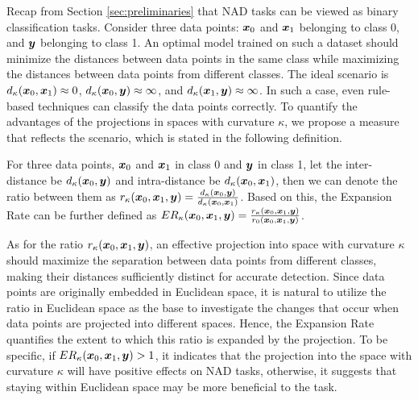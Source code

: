 Recap from Section \ref{sec:preliminaries} that NAD tasks can be viewed as binary classification tasks. Consider three data points: $\boldsymbol{x}_0$ and $\boldsymbol{x}_1$ belonging to class 0, and $\boldsymbol{y}$ belonging to class 1. An optimal model trained on such a dataset should minimize the distances between data points in the same class while maximizing the distances between data points from different classes. The ideal scenario is $d_\kappa(\boldsymbol{x}_0, \boldsymbol{x}_1)\approx0$, $d_\kappa(\boldsymbol{x}_0, \boldsymbol{y})\approx\infty$, and $d_\kappa(\boldsymbol{x}_1, \boldsymbol{y})\approx\infty$. In such a case, even rule-based techniques can classify the data points correctly. To quantify the advantages of the projections in spaces with curvature $\kappa$, we propose a measure that reflects the scenario, which is stated in the following definition. %
\begin{definition}
\label{def:expension}
    For three data points, $\boldsymbol{x}_0$ and $\boldsymbol{x}_1$ in class 0 and $\boldsymbol{y}$ in class 1, let the inter-distance be $d_\kappa(\boldsymbol{x}_0, \boldsymbol{y})$ and intra-distance be $d_\kappa(\boldsymbol{x}_0, \boldsymbol{x}_1)$, then we can denote the ratio between them as $r_\kappa(\boldsymbol{x}_0, \boldsymbol{x}_1, \boldsymbol{y}) = \frac{d_\kappa(\boldsymbol{x}_0, \boldsymbol{y})}{d_\kappa(\boldsymbol{x}_0, \boldsymbol{x}_1)}$. Based on this, the Expansion Rate can be further defined as $ER_\kappa(\boldsymbol{x}_0, \boldsymbol{x}_1, \boldsymbol{y}) = \frac{r_\kappa(\boldsymbol{x}_0, \boldsymbol{x}_1, \boldsymbol{y})}{r_0(\boldsymbol{x}_0, \boldsymbol{x}_1, \boldsymbol{y})}$. 
\end{definition}



As for the ratio $r_\kappa(\boldsymbol{x}_0, \boldsymbol{x}_1, \boldsymbol{y})$, an effective projection into space with curvature $\kappa$ should maximize the separation between data points from
different classes, making their distances sufficiently distinct for accurate detection. Since data points are originally embedded in Euclidean space, it is natural to utilize the ratio in Euclidean space as the base to investigate the changes that occur when data points are projected into different spaces. Hence, the Expansion Rate quantifies the extent to which this ratio is expanded by the projection. To be specific, if $ER_\kappa(\boldsymbol{x}_0, \boldsymbol{x}_1, \boldsymbol{y}) > 1$, it indicates that the projection into the space with curvature $\kappa$ will have positive effects on NAD tasks, otherwise, it suggests that staying within Euclidean space may be more beneficial to the task. 



